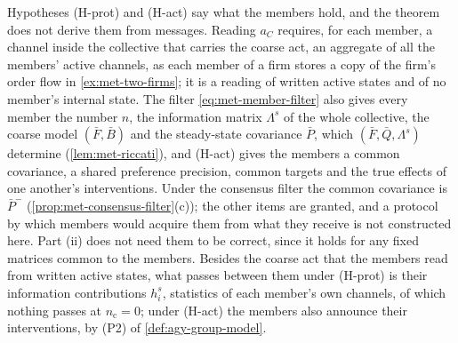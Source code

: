 Hypotheses (H-prot) and (H-act) say what the members hold, and the theorem does not derive them from messages. Reading $a_C$ requires, for each member, a channel inside the collective that carries the coarse act, an aggregate of all the members' active channels, as each member of a firm stores a copy of the firm's order flow in \cref{ex:met-two-firms}; it is a reading of written active states and of no member's internal state. The filter \eqref{eq:met-member-filter} also gives every member the number $n$, the information matrix $\Lambda^s$ of the whole collective, the coarse model $(\bar F,\bar B)$ and the steady-state covariance $\bar P$, which $(\bar F,\bar Q,\Lambda^s)$ determine (\cref{lem:met-riccati}), and (H-act) gives the members a common covariance, a shared preference precision, common targets and the true effects of one another's interventions. Under the consensus filter the common covariance is $\bar P^-$ (\cref{prop:met-consensus-filter}(c)); the other items are granted, and a protocol by which members would acquire them from what they receive is not constructed here. Part (ii) does not need them to be correct, since it holds for any fixed matrices common to the members. Besides the coarse act that the members read from written active states, what passes between them under (H-prot) is their information contributions $h^s_i$, statistics of each member's own channels, of which nothing passes at $n_{\mathrm c}=0$; under (H-act) the members also announce their interventions, by (P2) of \cref{def:agy-group-model}.


